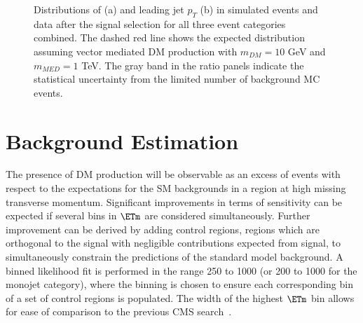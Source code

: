 \begin{figure}[hbtp]\begin{center}   \caption{ Distributions of \ETm (a) and leading jet $p_{T}$ (b) in simulated
events and data after the signal selection for all three event categories
combined. The dashed red line shows the expected distribution assuming vector
mediated DM production with $m_{DM}=10$ GeV and $m_{MED}=1$ TeV.  The gray band
in the ratio panels indicate the statistical uncertainty from the limited number
of background MC events.  } \label{fig:ptandmet}\end{center}\end{figure}


\section{Background Estimation}

The presence of DM production will be observable as an excess of events with
respect to the expectations for the SM backgrounds in a region at high missing
transverse momentum. Significant improvements in terms of sensitivity can be
expected if several bins in $\ETm$ are considered simultaneously. Further
improvement can be derived by adding control regions, regions which are
orthogonal to the signal with negligible contributions expected from signal, to
simultaneously constrain the predictions of the standard model background. A
binned likelihood fit is performed in the range 250 \gev to 1000 \gev (or 200
\gev to 1000 \gev for the monojet category), where the binning is chosen to
ensure each corresponding bin of a set of control regions is populated. The
width of the highest $\ETm$ bin allows for ease of comparison to the previous
CMS search~\cite{monojet1}. 

